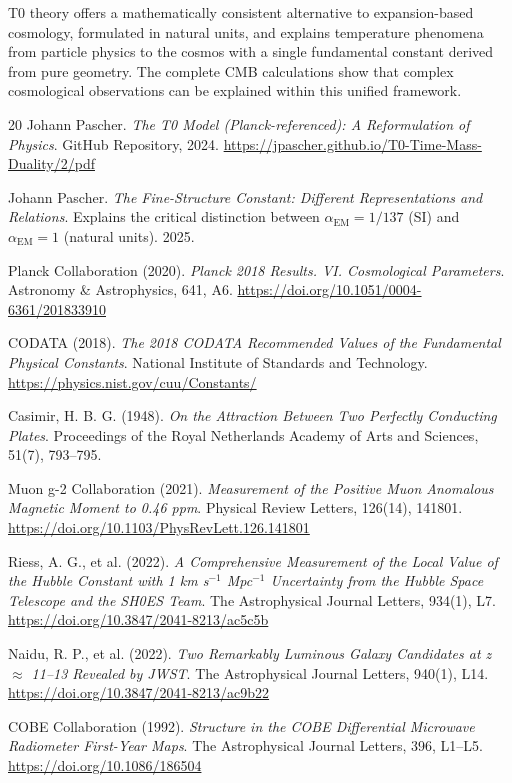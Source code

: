 	\begin{revolutionary}
		T0 theory offers a mathematically consistent alternative to expansion-based cosmology, formulated in natural units, and explains temperature phenomena from particle physics to the cosmos with a single fundamental constant derived from pure geometry. The complete CMB calculations show that complex cosmological observations can be explained within this unified framework.
	\end{revolutionary}
	

	
	\begin{thebibliography}{20}
		Johann Pascher.
		\textit{The T0 Model (Planck-referenced): A Reformulation of Physics}.
		GitHub Repository, 2024.
		\url{https://jpascher.github.io/T0-Time-Mass-Duality/2/pdf}
		
		Johann Pascher.
		\textit{The Fine-Structure Constant: Different Representations and Relations}.
		Explains the critical distinction between $\alpha_{\text{EM}} = 1/137$ (SI) and $\alpha_{\text{EM}} = 1$ (natural units).
		2025.
		
		Planck Collaboration (2020). 
		\textit{Planck 2018 Results. VI. Cosmological Parameters}. 
		Astronomy \& Astrophysics, 641, A6. 
		\url{https://doi.org/10.1051/0004-6361/201833910}
		
		CODATA (2018). 
		\textit{The 2018 CODATA Recommended Values of the Fundamental Physical Constants}. 
		National Institute of Standards and Technology. 
		\url{https://physics.nist.gov/cuu/Constants/}
		
		Casimir, H. B. G. (1948). 
		\textit{On the Attraction Between Two Perfectly Conducting Plates}. 
		Proceedings of the Royal Netherlands Academy of Arts and Sciences, 51(7), 793--795.
		
		Muon g-2 Collaboration (2021). 
		\textit{Measurement of the Positive Muon Anomalous Magnetic Moment to 0.46 ppm}. 
		Physical Review Letters, 126(14), 141801. 
		\url{https://doi.org/10.1103/PhysRevLett.126.141801}
		
		Riess, A. G., et al. (2022). 
		\textit{A Comprehensive Measurement of the Local Value of the Hubble Constant with 1 km s$^{-1}$ Mpc$^{-1}$ Uncertainty from the Hubble Space Telescope and the SH0ES Team}. 
		The Astrophysical Journal Letters, 934(1), L7. 
		\url{https://doi.org/10.3847/2041-8213/ac5c5b}
		
		Naidu, R. P., et al. (2022). 
		\textit{Two Remarkably Luminous Galaxy Candidates at z $\approx$ 11--13 Revealed by JWST}. 
		The Astrophysical Journal Letters, 940(1), L14. 
		\url{https://doi.org/10.3847/2041-8213/ac9b22}
		
		COBE Collaboration (1992). 
		\textit{Structure in the COBE Differential Microwave Radiometer First-Year Maps}. 
		The Astrophysical Journal Letters, 396, L1--L5. 
		\url{https://doi.org/10.1086/186504}
	\end{thebibliography}
